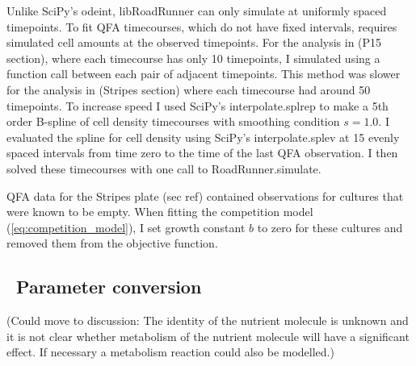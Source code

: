 
Unlike SciPy's odeint, libRoadRunner can only simulate at uniformly
spaced timepoints. To fit QFA timecourses, which do not have fixed
intervals, requires simulated cell amounts at the observed
timepoints. For the analysis in (P15 section), where each timecourse
has only 10 timepoints, I simulated using a function call between each
pair of adjacent timepoints. This method was slower for the analysis
in (Stripes section) where each timecourse had around 50 timepoints. To
increase speed I used SciPy's interpolate.splrep to make a 5th order
B-spline of cell density timecourses with smoothing condition
\(s=1.0\). I evaluated the spline for cell density using SciPy's
interpolate.splev at 15 evenly spaced intervals from time zero to the
time of the last QFA observation. I then solved these timecourses with
one call to RoadRunner.simulate.

QFA data for the Stripes plate (sec ref) contained observations for
cultures that were known to be empty. When fitting the competition
model (\ref{eq:competition_model}), I set growth constant \(b\) to
zero for these cultures and removed them from the objective function.







\subsection{\thesubsection~Parameter conversion}

(Could move to discussion: The identity of the
nutrient molecule is unknown and it is not clear whether metabolism of
the nutrient molecule will have a significant effect. If necessary a
metabolism reaction could also be modelled.)\\

